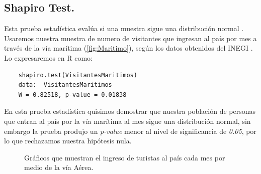 \documentclass[]{article}
\begin{document}
\subsection{Shapiro Test.}
 Esta prueba estadística evalúa si una muestra sigue una distribución normal \cite{Articulo_0}.
 Usaremos nuestra muestra de numero de visitantes que ingresan al país por mes a través de la vía marítima (\autoref{fig:Maritimo}), según los datos obtenidos del INEGI \cite{inegi}.
Lo expresaremos en R como:
  \begin{lstlisting}
	shapiro.test(VisitantesMaritimos)
	data:  VisitantesMaritimos
	W = 0.82518, p-value = 0.01838

   \end{lstlisting}
 En esta prueba estadística quisimos demostrar que  nuestra población de personas que entran al país por la vía marítima al mes sigue una distribución normal, sin embargo la prueba produjo un \textit{p-value}  menor al nivel de significancia de \textit{0.05}, por lo que rechazamos nuestra hipótesis nula.
\begin{figure}
\centering
{}%
\hfill
{}%
\hfill

\caption{Gráficos que muestran el ingreso de turistas al país cada mes por medio de la vía Aérea.}
\label{fig:Avion}
\end{figure}
\end{document}
